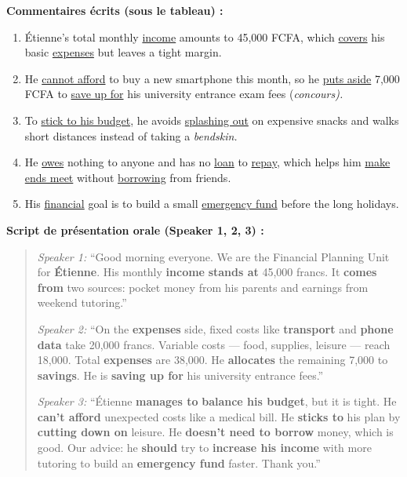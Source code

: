 \documentclass[11pt]{article}
\providecommand{\uline}[1]{\underline{#1}}\providecommand{\ul}[1]{\underline{#1}}
\newcommand{\eng}[1]{\ifmmode\text{\textit{#1}}\else\begingroup\selectlanguage{english}\itshape #1\endgroup\fi}
\begin{document}
\begin{exoresolu}
\textbf{Commentaires écrits (sous le tableau) :}
\begin{enumerate}
    \item Étienne's total monthly \uline{income} amounts to 45,000 FCFA, which \uline{covers} his basic \uline{expenses} but leaves a tight margin.
    \item He \uline{cannot afford} to buy a new smartphone this month, so he \uline{puts aside} 7,000 FCFA to \uline{save up for} his university entrance exam fees (\eng{concours}).
    \item To \uline{stick to his budget}, he avoids \uline{splashing out} on expensive snacks and walks short distances instead of taking a \eng{bendskin}.
    \item He \uline{owes} nothing to anyone and has no \uline{loan} to \uline{repay}, which helps him \uline{make ends meet} without \uline{borrowing} from friends.
    \item His \uline{financial} goal is to build a small \uline{emergency fund} before the long holidays.
\end{enumerate}

\textbf{Script de présentation orale (Speaker 1, 2, 3) :}
\begin{quote}
\textit{Speaker 1:} “Good morning everyone. We are the Financial Planning Unit for \textbf{Étienne}. His monthly \textbf{income} \textbf{stands at} 45,000 francs. It \textbf{comes from} two sources: pocket money from his parents and earnings from weekend tutoring.”

\textit{Speaker 2:} “On the \textbf{expenses} side, fixed costs like \textbf{transport} and \textbf{phone data} take 20,000 francs. Variable costs — food, supplies, leisure — reach 18,000. Total \textbf{expenses} are 38,000. He \textbf{allocates} the remaining 7,000 to \textbf{savings}. He is \textbf{saving up for} his university entrance fees.”

\textit{Speaker 3:} “Étienne \textbf{manages to} \textbf{balance his budget}, but it is tight. He \textbf{can't afford} unexpected costs like a medical bill. He \textbf{sticks to} his plan by \textbf{cutting down on} leisure. He \textbf{doesn't need to borrow} money, which is good. Our advice: he \textbf{should} try to \textbf{increase his income} with more tutoring to build an \textbf{emergency fund} faster. Thank you.”
\end{quote}


\end{exoresolu}
\end{document}
